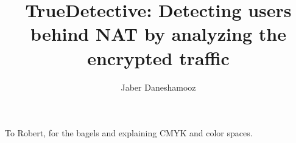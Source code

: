 \documentclass[sigconf]{acmart}
\begin{document}
\title{TrueDetective: Detecting users behind NAT by analyzing the encrypted traffic}


\author{Jaber Daneshamooz}







\renewcommand{\shortauthors}{Jaber et al.}






\maketitle
% 










\begin{acks}
To Robert, for the bagels and explaining CMYK and color spaces.
\end{acks}



\end{document}

